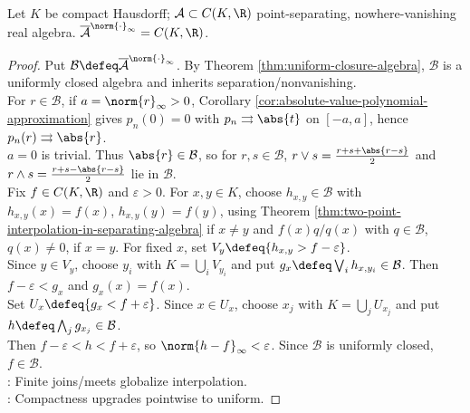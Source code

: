 \begin{theorem} \label{thm:real-stone-weierstrass} \\
Let $K$ be compact Hausdorff; $\mathcal{A}\subset C(K,\R)$ point-separating, nowhere-vanishing real algebra. $\overline{\mathcal{A}}^{\norm{\cdot}_\infty}=C(K,\R)$.
\begin{proof} Put $\mathcal{B}\defeq\overline{\mathcal{A}}^{\norm{\cdot}_\infty}$. By Theorem \ref{thm:uniform-closure-algebra}, $\mathcal{B}$ is a uniformly closed algebra and inherits separation/nonvanishing.\\
For $r\in\mathcal{B}$, if $a=\norm{r}_\infty>0$, Corollary \ref{cor:absolute-value-polynomial-approximation} gives $p_n(0)=0$ with $p_n\rightrightarrows\abs{t}$ on $[-a,a]$, hence $p_n(r)\rightrightarrows\abs{r}$.\\
$a=0$ is trivial. Thus $\abs{r}\in\mathcal{B}$, so for $r,s\in\mathcal{B}$, $r\vee s=\frac{r+s+\abs{r-s}}{2}$ and $r\wedge s=\frac{r+s-\abs{r-s}}{2}$ lie in $\mathcal{B}$.\\
Fix $f\in C(K,\R)$ and $\varepsilon>0$. For $x,y\in K$, choose $h_{x,y}\in\mathcal{B}$ with $h_{x,y}(x)=f(x)$, $h_{x,y}(y)=f(y)$, using Theorem \ref{thm:two-point-interpolation-in-separating-algebra} if $x\neq y$ and $f(x)q/q(x)$ with $q\in\mathcal{B}$, $q(x)\neq0$, if $x=y$. For fixed $x$, set $V_y\defeq\{h_{x,y}>f-\varepsilon\}$.\\
Since $y\in V_y$, choose $y_i$ with $K=\bigcup_iV_{y_i}$ and put $g_x\defeq\bigvee_i h_{x,y_i}\in\mathcal{B}$. Then $f-\varepsilon<g_x$ and $g_x(x)=f(x)$.\\
Set $U_x\defeq\{g_x<f+\varepsilon\}$. Since $x\in U_x$, choose $x_j$ with $K=\bigcup_jU_{x_j}$ and put $h\defeq\bigwedge_j g_{x_j}\in\mathcal{B}$.\\
Then $f-\varepsilon<h<f+\varepsilon$, so $\norm{h-f}_\infty<\varepsilon$. Since $\mathcal{B}$ is uniformly closed, $f\in\mathcal{B}$.\\
: Finite joins/meets globalize interpolation.\\
: Compactness upgrades pointwise to uniform.
\end{proof}
\end{theorem}

